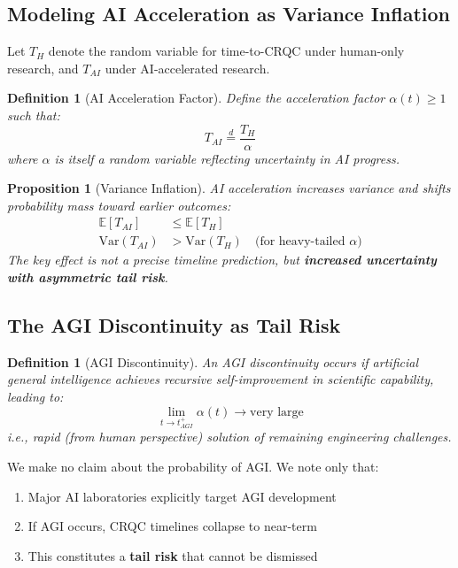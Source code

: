 \documentclass[11pt,a4paper]{article}
\newtheorem{proposition}[theorem]{Proposition}
\newtheorem{definition}[theorem]{Definition}
\begin{document}
\subsection{Modeling AI Acceleration as Variance Inflation}

Let $T_H$ denote the random variable for time-to-CRQC under human-only research, and $T_{AI}$ under AI-accelerated research.

\begin{definition}[AI Acceleration Factor]
Define the acceleration factor $\alpha(t) \geq 1$ such that:
\begin{equation}
T_{AI} \stackrel{d}{=} \frac{T_H}{\alpha}
\end{equation}
where $\alpha$ is itself a random variable reflecting uncertainty in AI progress.
\end{definition}

\begin{proposition}[Variance Inflation]
AI acceleration increases variance and shifts probability mass toward earlier outcomes:
\begin{align}
\mathbb{E}[T_{AI}] &\leq \mathbb{E}[T_H] \\
\text{Var}(T_{AI}) &> \text{Var}(T_H) \quad \text{(for heavy-tailed } \alpha \text{)}
\end{align}
The key effect is not a precise timeline prediction, but \textbf{increased uncertainty with asymmetric tail risk}.
\end{proposition}

\subsection{The AGI Discontinuity as Tail Risk}

\begin{definition}[AGI Discontinuity]
An AGI discontinuity occurs if artificial general intelligence achieves recursive self-improvement in scientific capability, leading to:
\begin{equation}
\lim_{t \to t_{AGI}^+} \alpha(t) \to \text{very large}
\end{equation}
i.e., rapid (from human perspective) solution of remaining engineering challenges.
\end{definition}

We make no claim about the probability of AGI. We note only that:
\begin{enumerate}[noitemsep]
    \item Major AI laboratories explicitly target AGI development
    \item If AGI occurs, CRQC timelines collapse to near-term
    \item This constitutes a \textbf{tail risk} that cannot be dismissed
\end{enumerate}
\end{document}
